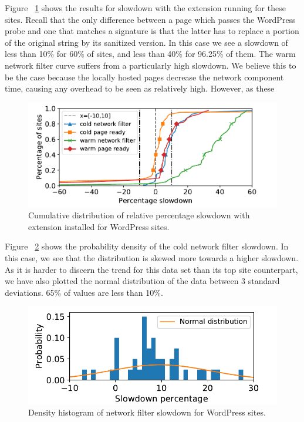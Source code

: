 Figure ~\ref{fig:wordpress_slowdown} shows the results for slowdown with the extension running for these sites. Recall that the only difference between a page which passes the WordPress probe and one that matches a signature is that the latter has to replace a portion of the original string by its sanitized version. In this case we see a slowdown of less than 10\% for 60\% of sites, and less than 40\% for 96.25\% of them. The warm network filter curve suffers from a particularly high slowdown. We believe this to be the case because the locally hosted pages decrease the network component time, causing any overhead to be seen as relatively high. However, as these 

\begin{figure}[h]
	\includegraphics[scale=0.5]{results/extension_slowdown_wordpress_small.pdf}
	\caption{Cumulative distribution of relative percentage slowdown with extension installed for WordPress sites.}
	\label{fig:wordpress_slowdown}
\end{figure}

Figure ~\ref{fig:histogram_slowdown_wordpress} shows the probability density of the cold network filter slowdown. In this case, we see that the distribution is skewed more towards a higher slowdown. As it is harder to discern the trend for this data set than its top site counterpart, we have also plotted the normal distribution of the data between 3 standard deviations. 65\% of values are less than 10\%.

\begin{figure}[h]
	\includegraphics[scale=0.5]{results/density_histogram_filter_slowdown_wordpress_small.pdf}
	\caption{Density histogram of network filter slowdown for WordPress sites.}
	\label{fig:histogram_slowdown_wordpress}
\end{figure}

